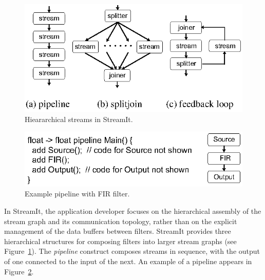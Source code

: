 \begin{figure}[t]
\begin{center}
 \includegraphics[scale=1, angle=0]{./constructs-eg.eps}
 \caption{Hieararchical streams in StreamIt.}
 \label{fig:containers}
\end{center}
\end{figure}

\begin{figure}[t]
\begin{center}
\vspace{-12pt}
 \includegraphics[scale=1, angle=0]{./pipeline-eg.eps}
 \caption{Example pipeline with FIR filter.}
 \label{fig:pipeline}
\end{center}
\end{figure}

In StreamIt, the
application developer focuses on the hierarchical assembly of the
stream graph and its communication topology, rather than on the 
explicit management of the data buffers between filters.
StreamIt provides three hierarchical structures for composing filters
into larger stream graphs (see Figure~\ref{fig:containers}). The 
{\it pipeline} construct composes streams in sequence, with the output
of one connected to the input of the next.   An example of a pipeline
appears in Figure~\ref{fig:pipeline}.

